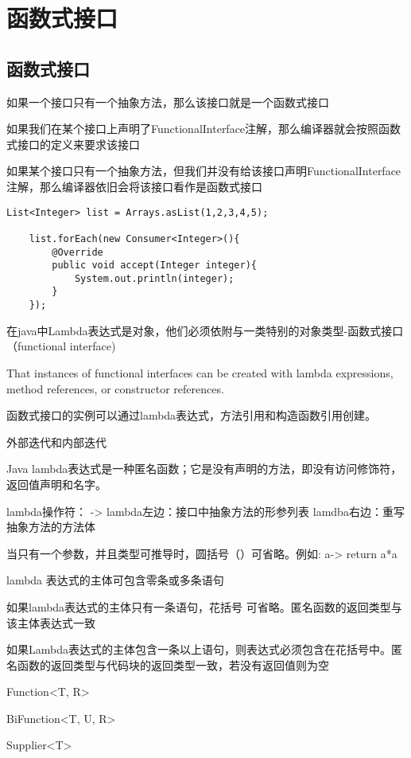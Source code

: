 \chapter{函数式接口}
\label{chap:functional}


\section{函数式接口}

如果一个接口只有一个抽象方法，那么该接口就是一个函数式接口

如果我们在某个接口上声明了FunctionalInterface注解，那么编译器就会按照函数式接口的定义来要求该接口

如果某个接口只有一个抽象方法，但我们并没有给该接口声明FunctionalInterface注解，那么编译器依旧会将该接口看作是函数式接口

\begin{lstlisting}[style=cjava]
    List<Integer> list = Arrays.asList(1,2,3,4,5);

    list.forEach(new Consumer<Integer>(){
        @Override
        public void accept(Integer integer){
            System.out.println(integer);
        }
    });
\end{lstlisting}

在java中Lambda表达式是对象，他们必须依附与一类特别的对象类型-函数式接口（functional interface)

That instances of functional interfaces can be created with lambda expressions, method references, or constructor references.

函数式接口的实例可以通过lambda表达式，方法引用和构造函数引用创建。


外部迭代和内部迭代

Java lambda表达式是一种匿名函数；它是没有声明的方法，即没有访问修饰符，返回值声明和名字。

lambda操作符： ->
lambda左边：接口中抽象方法的形参列表
lamdba右边：重写抽象方法的方法体


当只有一个参数，并且类型可推导时，圆括号（）可省略。例如: a-> return a*a

lambda 表达式的主体可包含零条或多条语句

如果lambda表达式的主体只有一条语句，花括号{} 可省略。匿名函数的返回类型与该主体表达式一致

如果Lambda表达式的主体包含一条以上语句，则表达式必须包含在花括号{}中。匿名函数的返回类型与代码块的返回类型一致，若没有返回值则为空



Function<T, R>
 
BiFunction<T, U, R>

Supplier<T>


